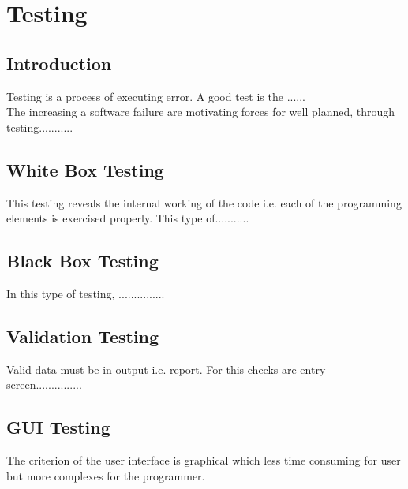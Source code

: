 \chapter{Testing}


\section{Introduction}
Testing is a process of executing error. A good test is the ......\\ 
 The increasing  a software failure are motivating forces for well planned, through testing...........\\


\section{White Box Testing}
This testing reveals the internal working of the code i.e. each of the programming elements is exercised properly. This type of...........\\




\section{Black Box Testing}
In this type of testing, ...............\\





\section{Validation Testing}
Valid data must be in output i.e. report. For this  checks are  entry screen...............\\



\section{GUI Testing}
The criterion of the user interface is graphical which less time consuming for user but more complexes for the programmer.\\



